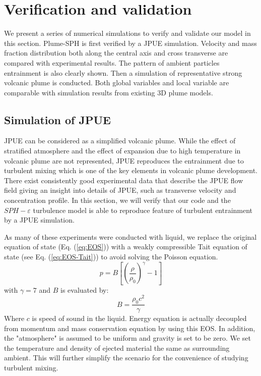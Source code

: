 \documentclass[journal abbreviation, manuscript]{copernicus}
\begin{document}
\section{Verification and validation} \label{sec:verification-validation}
We present a series of numerical simulations to verify and validate our model in this section. Plume-SPH is first verified by a JPUE simulation. Velocity and mass fraction distribution both along the central axis and cross transverse are compared with experimental results. The pattern of ambient particles entrainment is also clearly shown. Then a simulation of representative strong volcanic plume is conducted. Both global variables and local variable are comparable with simulation results from existing 3D plume models.

\subsection{Simulation of JPUE}
JPUE can be considered as a simplified volcanic plume. While the effect of stratified atmosphere and the effect of expansion due to high temperature in volcanic plume are not represented, JPUE reproduces the entrainment due to turbulent mixing which is one of the key elements in volcanic plume development. There exist consistently good experimental data \citep { list1982turbulent,dimotakis1983structure, papanicolaou1988investigations} that describe the JPUE flow field giving an insight into details of JPUE, such as transverse velocity and concentration profile. In this section, we will verify that our code and the $SPH-\varepsilon$ turbulence model is able to reproduce feature of turbulent entrainment by a JPUE simulation.

As many of these experiments were conducted with liquid, we replace the original equation of state (Eq. (\ref{eq:EOS})) with a weakly compressible Tait equation of state \citep {becker2007weakly} (see Eq. (\ref{eq:EOS-Tait})) to avoid solving the Poisson equation.
\begin{equation}
p=B[(\dfrac{\rho}{\rho_0})^{\gamma}-1]
\label{eq:EOS-Tait}
\end{equation}
with $\gamma=7$ and $B$ is evaluated by:
\begin{equation}
B=\dfrac{\rho_0 c^2}{\gamma}
\end{equation}
Where $c$ is speed of sound in the liquid. Energy equation is actually decoupled from momentum and mass conservation equation by using this EOS. In addition, the "atmosphere" is assumed to be uniform and gravity is set to be zero. We set the temperature and density of ejected material the same as surrounding ambient. This will further simplify the scenario for the convenience of studying turbulent mixing. 
\end{document}
